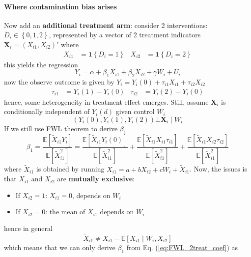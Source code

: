 \documentclass[twoside]{article}
\begin{document}
\paragraph*{Where contamination bias arises} Now add an \textbf{additional treatment arm}: consider 2  interventions: $D_i \in \left\{0,1,2\right\}$, represented by a vector of 2 treatment indicators $\mathbf{X}_i = \left(X_{i1},X_{i2}\right)'$ where 
\begin{align*}
    X_{i1}&=\mathbf{1}\left\{D_i=1\right\} & X_{i2}&=\mathbf{1}\left\{D_i=2\right\}
\end{align*}
this yields the regression 
\begin{equation}\label{eq:example_2treatment}
    Y_i = \alpha + \beta_1 X_{i1} + \beta_2 X_{i2} + \gamma W_i + U_i
\end{equation}
now the observe outcome is given by $Y_i = Y_i(0) +\tau_{i1}X_{i1}+ \tau_{i2}X_{i2}$
\begin{align*}
    \tau_{i1} &= Y_i(1)- Y_i(0) & \tau_{i2} &= Y_i(2)-Y_i(0)
\end{align*}
hence, some heterogeneity in treatment effect emerges. Still, assume $\mathbf{X}_i$ is conditionally independent of $Y_i(d)$ given control $W_i$
$$
\left( Y_i(0),Y_i(1),Y_i(2) \right) \bot \mathbf{X}_i \mid W_i
$$
If we still use FWL theorem to derive $\beta_1$
\begin{equation}\label{eq:FWL_2treat_coef}
    \beta_1 = \frac{\mathbb{E}\left[ \tilde{X}_{i1}Y_i \right]}{\mathbb{E}\left[ \tilde{X}^2_{i1} \right]} = \frac{\mathbb{E}\left[ \tilde{X}_{i1}Y_i(0) \right]}{\mathbb{E}\left[ \tilde{X}^2_{i1} \right]} + \frac{\mathbb{E}\left[ \tilde{X}_{i1} X_{i1}\tau_{i1} \right]}{\mathbb{E}\left[ \tilde{X}^2_{i1} \right]} + \frac{\mathbb{E}\left[ \tilde{X}_{i1} X_{i2}\tau_{i2} \right]}{\mathbb{E}\left[ \tilde{X}^2_{i1} \right]}
\end{equation}
where $\tilde{X}_{i1}$ is obtained by running $X_{i1} = a+bX_{i2}+cW_i +\tilde{X}_{i1}$. Now, the issues is that $X_{i1}$ and $X_{i2}$ are \textbf{mutually exclusive}:
\begin{itemize}
    \item If $X_{i2} = 1$: $X_{i1}=0$,  depends on $W_i$
    \item If $X_{i2} = 0$: the mean of $X_{i1}$ depends on $W_i$
\end{itemize}
hence in general
$$
\tilde{X}_{i1} \neq X_{i1} - \mathbb{E}\left[ X_{i1}\mid W_i,X_{i2} \right]
$$
which means that we can only derive $\beta_1$ from Eq. (\ref{eq:FWL_2treat_coef}) as 
\end{document}
